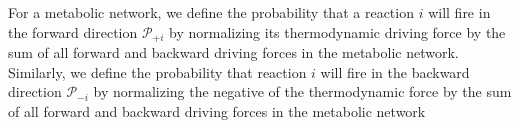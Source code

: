 For a metabolic network, we define the probability that a reaction $i$ will fire in the forward  direction ${\mathcal P_{+i}}$ by normalizing its thermodynamic driving force by the sum of all forward and backward driving forces in the metabolic network. Similarly, we define the probability that reaction $i$ will fire in the backward direction $\mathcal P_{-i}$ by normalizing the negative of the thermodynamic force by  the sum of all forward and backward driving forces in the metabolic network
